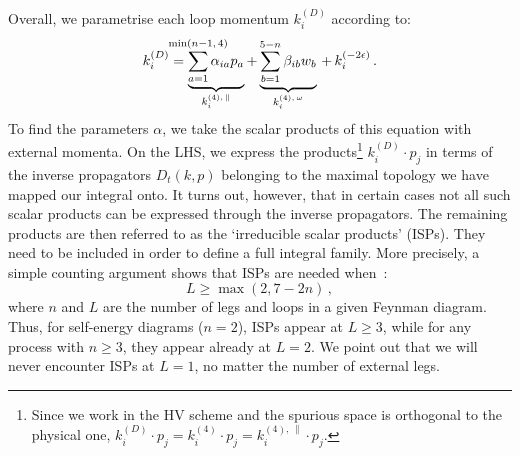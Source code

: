\documentclass[main.tex]{subfiles}
\begin{document}
Overall, we parametrise each loop momentum $k_i^{(D)}$ according to:
\begin{equation} \label{eq:kdecomposition}
    k_i^{(D)} = \underbrace{\sum_{a=1}^{\mathclap{\min(n-1,\, 4)}} \alpha_{ia} p_a}_{k_i^{(4),\,\parallel}} + \underbrace{\sum_{b=1}^{5-n} \beta_{ib} w_b}_{k_i^{(4),\,\omega}} \, + \, k_i^{(-2\eps)}\,.
\end{equation}
To find the parameters $\alpha$, we take the scalar products of this equation with external momenta. On the LHS, we express the products\footnote{Since we work in the HV scheme and the spurious space is orthogonal to the physical one, $k_i^{(D)} \cdot p_j = k_i^{(4)} \cdot p_j = k_i^{(4),\,\parallel} \cdot p_j$.} $k_i^{(D)} \cdot p_j$ in terms of the inverse propagators $D_t(k,p)$ belonging to the maximal topology we have mapped our integral onto. It turns out, however, that in certain cases not all such scalar products can be expressed through the inverse propagators. The remaining products are then referred to as the `irreducible scalar products' (ISPs). They need to be included in order to define a full integral family. More precisely, a simple counting argument shows that ISPs are needed when~\cite{grozin:2011mt}:
\begin{equation} \label{eq:ISPcondition}
    L \ge \max (2, 7-2n)\,,
\end{equation}
where $n$ and $L$ are the number of legs and loops in a given Feynman diagram. Thus, for self-energy diagrams ($n=2$), ISPs appear at $L\ge3$, while for any process with $n\ge3$, they appear already at $L=2$. We point out that we will never encounter ISPs at $L=1$, no matter the number of external legs.
\end{document}
